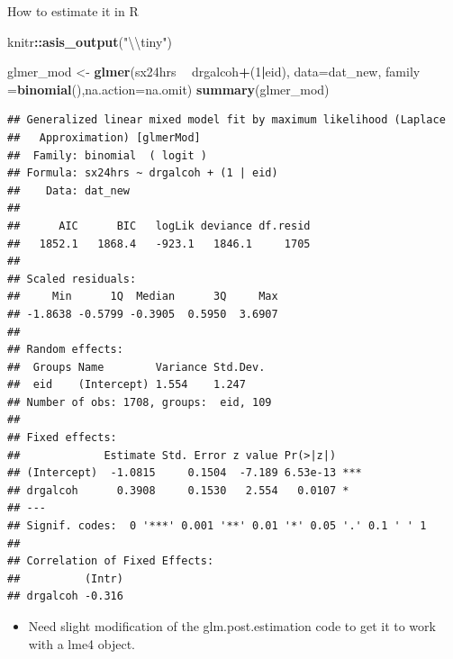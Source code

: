 \documentclass[ignorenonframetext,]{beamer}
\newenvironment{Shaded}{\begin{snugshade}}{\end{snugshade}}
\newcommand{\KeywordTok}[1]{\textcolor[rgb]{0.13,0.29,0.53}{\textbf{#1}}}
\newcommand{\DataTypeTok}[1]{\textcolor[rgb]{0.13,0.29,0.53}{#1}}
\newcommand{\DecValTok}[1]{\textcolor[rgb]{0.00,0.00,0.81}{#1}}
\newcommand{\CharTok}[1]{\textcolor[rgb]{0.31,0.60,0.02}{#1}}
\newcommand{\StringTok}[1]{\textcolor[rgb]{0.31,0.60,0.02}{#1}}
\newcommand{\OperatorTok}[1]{\textcolor[rgb]{0.81,0.36,0.00}{\textbf{#1}}}
\newcommand{\NormalTok}[1]{#1}
\providecommand{\tightlist}{%
  \setlength{\itemsep}{0pt}\setlength{\parskip}{0pt}}
\begin{document}
\begin{frame}[fragile]{How to estimate it in R}

\begin{Shaded}
\begin{Highlighting}[]
\NormalTok{knitr}\OperatorTok{::}\KeywordTok{asis_output}\NormalTok{(}\StringTok{"}\CharTok{\textbackslash{}\textbackslash{}}\StringTok{tiny"}\NormalTok{)}
\end{Highlighting}
\end{Shaded}

\tiny

\begin{Shaded}
\begin{Highlighting}[]
\NormalTok{glmer_mod <-}\StringTok{ }\KeywordTok{glmer}\NormalTok{(sx24hrs }\OperatorTok{~}\StringTok{ }\NormalTok{drgalcoh}\OperatorTok{+}\NormalTok{(}\DecValTok{1}\OperatorTok{|}\NormalTok{eid), }\DataTypeTok{data=}\NormalTok{dat_new, }\DataTypeTok{family =}\KeywordTok{binomial}\NormalTok{(),}\DataTypeTok{na.action=}\NormalTok{na.omit)}
\KeywordTok{summary}\NormalTok{(glmer_mod)}
\end{Highlighting}
\end{Shaded}

\begin{verbatim}
## Generalized linear mixed model fit by maximum likelihood (Laplace
##   Approximation) [glmerMod]
##  Family: binomial  ( logit )
## Formula: sx24hrs ~ drgalcoh + (1 | eid)
##    Data: dat_new
## 
##      AIC      BIC   logLik deviance df.resid 
##   1852.1   1868.4   -923.1   1846.1     1705 
## 
## Scaled residuals: 
##     Min      1Q  Median      3Q     Max 
## -1.8638 -0.5799 -0.3905  0.5950  3.6907 
## 
## Random effects:
##  Groups Name        Variance Std.Dev.
##  eid    (Intercept) 1.554    1.247   
## Number of obs: 1708, groups:  eid, 109
## 
## Fixed effects:
##             Estimate Std. Error z value Pr(>|z|)    
## (Intercept)  -1.0815     0.1504  -7.189 6.53e-13 ***
## drgalcoh      0.3908     0.1530   2.554   0.0107 *  
## ---
## Signif. codes:  0 '***' 0.001 '**' 0.01 '*' 0.05 '.' 0.1 ' ' 1
## 
## Correlation of Fixed Effects:
##          (Intr)
## drgalcoh -0.316
\end{verbatim}

\begin{itemize}
\tightlist
\item
  Need slight modification of the glm.post.estimation code to get it to
  work with a lme4 object.
\end{itemize}


\end{frame}
\end{document}
